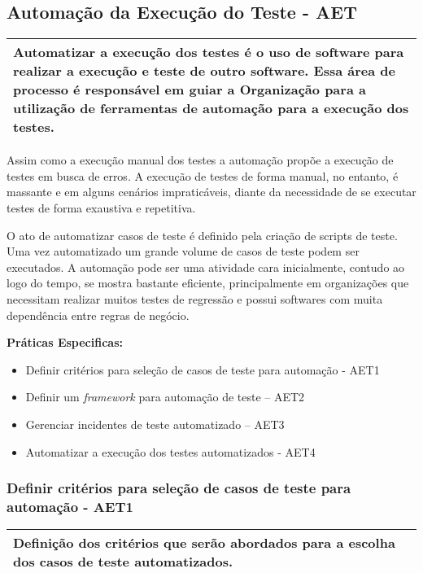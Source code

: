 \subsection{Automação da Execução do Teste - AET}
\label{sec:aet}

\begin{table}[!ht]
\centering
\begin{tabular}{|p{130mm}|}
\hline
Automatizar a execução dos testes é o uso de software para realizar a execução e teste de outro software. Essa área de processo é responsável em guiar a Organização para a utilização de ferramentas de automação para a execução dos testes. \\ 
\hline
\end{tabular}
\end{table}

Assim como a execução manual dos testes a automação propõe a execução de testes em busca de erros. A execução de testes de forma manual, no entanto, é massante e em alguns cenários impraticáveis, diante da necessidade de se executar testes de forma exaustiva e repetitiva.

O ato de automatizar casos de teste é definido pela criação de scripts de teste. Uma vez automatizado um grande volume de casos de teste podem ser executados. A automação pode ser uma atividade cara inicialmente, contudo ao logo do tempo, se mostra bastante eficiente, principalmente em organizações que necessitam realizar muitos testes de regressão e possui softwares com muita dependência entre regras de negócio.

\textbf{Práticas Especificas:}
\begin{itemize}
    \item Definir critérios para seleção de casos de teste para automação - AET1
    \item Definir um \textit{framework} para automação de teste – AET2
    \item Gerenciar incidentes de teste automatizado – AET3
    \item Automatizar a execução dos testes automatizados - AET4
\end{itemize}

\subsubsection{Definir critérios para seleção de casos de teste para automação - AET1}
\label{sec:aet1}

\begin{table}[!ht]
\centering
\begin{tabular}{|p{130mm}|}
\hline
Definição dos critérios que serão abordados para a escolha dos casos de teste automatizados. \\ 
\hline
\end{tabular}
\end{table}

